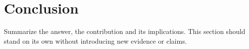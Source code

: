 \section{Conclusion}
Summarize the answer, the contribution and its implications. This section should
stand on its own without introducing new evidence or claims.


